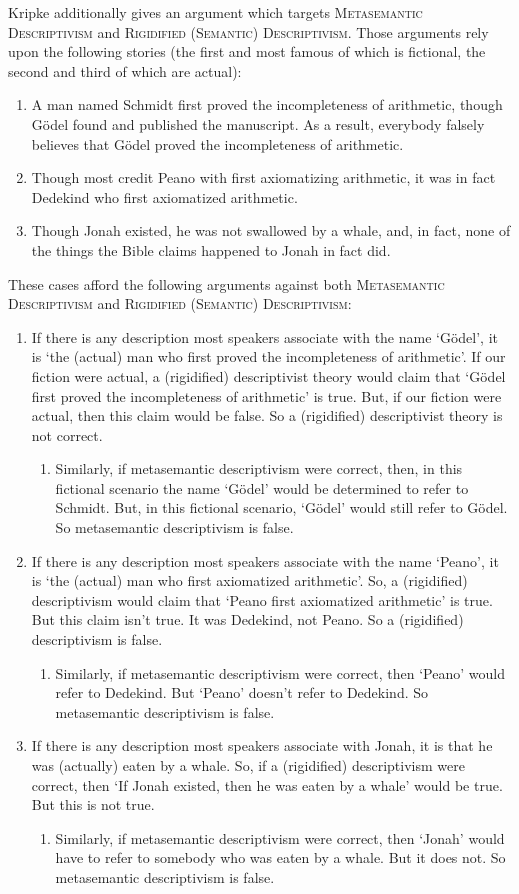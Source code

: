 \documentclass[landscape, two column, full page,reqno]{article}
\newcommand{\qe}{\begin{enumerate}[align=left,style=nextline,leftmargin=17pt,labelsep=5pt,font=\normalfont]}
\newcommand{\qer}{\begin{enumerate}[align=left,style=nextline,leftmargin=17pt,labelsep=5pt,font=\normalfont , resume]}
\newcommand{\ze}{\end{enumerate}}
\newcommand{\p}{\item}
\newcommand{\s}{\textsc}
\begin{document}
\p Kripke additionally gives an argument which targets \s{Metasemantic Descriptivism} and \s{Rigidified (Semantic) Descriptivism}.  Those arguments rely upon the following stories (the first and most famous of which is fictional, the second and third of which are actual):
	\qe
	\p A man named Schmidt first proved the incompleteness of arithmetic, though G\"odel found and published the manuscript.  As a result, everybody falsely believes that G\"odel proved the incompleteness of arithmetic.
	\p Though most credit Peano with first axiomatizing arithmetic, it was in fact Dedekind who first axiomatized arithmetic.
	\p Though Jonah existed, he was not swallowed by a whale, and, in fact, none of the things the Bible claims happened to Jonah in fact did.
	\ze 
\p These cases afford the following arguments against both \s{Metasemantic Descriptivism} and \s{Rigidified (Semantic) Descriptivism}:
	\qe
	\p  If there is any description most speakers associate with the name `G\"odel', it is `the (actual) man who first proved the incompleteness of arithmetic'.  If our fiction were actual, a (rigidified) descriptivist theory would claim that `G\"odel first proved the incompleteness of arithmetic' is true.  But, if our fiction were actual, then this claim would be false.  So a (rigidified) descriptivist theory is not correct.
		\qe
		\p Similarly, if metasemantic descriptivism were correct, then, in this fictional scenario the name `G\"odel' would be determined to refer to Schmidt.  But, in this fictional scenario, `G\"odel' would still refer to G\"odel.  So metasemantic descriptivism is false.
		\ze 
	\p If there is any description most speakers associate with the name `Peano', it is `the (actual) man who first axiomatized arithmetic'.  So, a (rigidified) descriptivism would claim that `Peano first axiomatized arithmetic' is true.  But this claim isn't true.  It was Dedekind, not Peano.  So a (rigidified) descriptivism is false.
		\qer
		\p Similarly, if metasemantic descriptivism were correct, then `Peano' would refer to Dedekind.  But `Peano' doesn't refer to Dedekind.  So metasemantic descriptivism is false.
		\ze 
	\p If there is any description most speakers associate with Jonah, it is that he was (actually) eaten by a whale.  So, if a (rigidified) descriptivism were correct, then `If Jonah existed, then he was eaten by a whale' would be true.  But this is not true.
		\qer
		\p Similarly, if metasemantic descriptivism were correct, then `Jonah' would have to refer to somebody who was eaten by a whale.  But it does not.  So metasemantic descriptivism is false.
		\ze 
	\ze 
	
\end{document}
